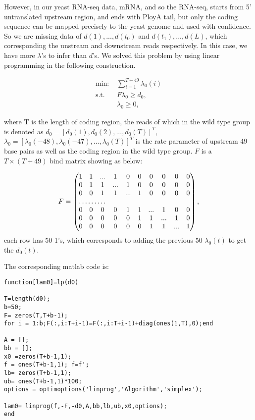 \documentclass{article}
\begin{document}
However, in our yeast RNA-seq data, mRNA, and so the RNA-seq, starts from 5' untranslated upstream region, and ends with PloyA tail, but only the coding sequence can be mapped precisely to the yeast genome and used with confidence. So we are missing data of $d(1) ,..., d(t_0)$ and $d(t_1) ,..., d(L)$, which corresponding the unstream  and downstream reads respectively. In this case, we have more $\lambda$'s to infer than $d$'s. We solved this problem by using linear programming in the following construction.

\begin{align*}
\text{min: } &\sum_{i=1}^{T+49} \lambda_{0}(i)\\
\text{s.t. } &F\lambda_0 \ge d_0,\\
 &\lambda_0 \ge 0,
\end{align*}

where T is the length of coding region, the reads of which in the wild type group is denoted as $d_0=[d_0(1),d_0(2),...,d_0(T)]^T$, $\lambda_0 = [\lambda_0(-48),\lambda_0(-47),...,\lambda_0(T)]^T$ is the rate parameter of upstream 49 base pairs as well as the coding region in the wild type group. $F$ is a $T \times (T+49)$ bind matrix showing as below: 

\begin{equation}\label{F}
F=\begin{pmatrix}
	1&1&...&1&0&0&0&0&0&0\\
	0&1&1&...&1&0&0&0&0&0\\
	0&0&1&1&...&1&0&0&0&0\\
	\hdotsfor{3} \\
	0&0&0&0&1&1&...&1&0&0\\
	0&0&0&0&0&1&1&...&1&0\\
	0&0&0&0&0&0&1&1&...&1\\
\end{pmatrix},
\end{equation}
each row has 50 1's, which corresponds to adding the previous 50 $\lambda_0(t)$ to get the $d_0(t)$.

The corresponding matlab code is:

 \begin{lstlisting}[frame=single]
function[lam0]=lp(d0)

T=length(d0);
b=50;
F= zeros(T,T+b-1);
for i = 1:b;F(:,i:T+i-1)=F(:,i:T+i-1)+diag(ones(1,T),0);end

A = [];
bb = [];
x0 =zeros(T+b-1,1);
f = ones(T+b-1,1); f=f';
lb= zeros(T+b-1,1);
ub= ones(T+b-1,1)*100;
options = optimoptions('linprog','Algorithm','simplex');

lam0= linprog(f,-F,-d0,A,bb,lb,ub,x0,options); 
end
 \end{lstlisting}
\end{document}
